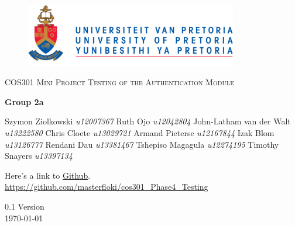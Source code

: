 \begin{titlepage}
	\begin{center}
		
		\begin{figure}[t]
			\centering		
			
			\includegraphics[width=350px]{UP_Logo.png}
		\end{figure}
		
		\textsc{\LARGE COS301 Mini Project \newline\newline Testing of the Authentication Module}
		
		\textbf{\newline Group 2a} \\
		\begin{flushright} \large
			Szymon Ziolkowski \emph{u12007367} \newline
			Ruth Ojo \emph{u12042804} \newline
			John-Latham van der Walt \emph{u13222580} \newline
			Chris Cloete \emph{u13029721} \newline
			Armand Pieterse \emph{u12167844} \newline
			Izak Blom \emph{u13126777} \newline
			Rendani Dau \emph{u13381467} \newline
			Tshepiso Magagula \emph{u12274195} \newline
			Timothy Snayers \emph{u13397134} \newline
		\end{flushright}
		
		\vfill
		
	Here's a link to \href{https://github.com/masterfloki/cos301_Phase4_Testing}{Github}.\\
	\url{https://github.com/masterfloki/cos301_Phase4_Testing}

	\vfill

	{\large 0.1 Version}
	\\
	{\large \today}		
		
		
	\end{center}
\end{titlepage}
